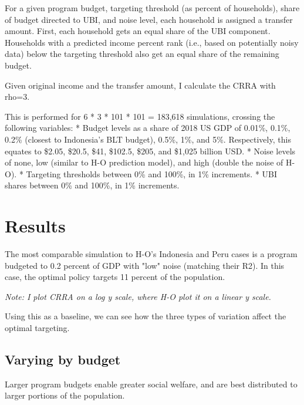 \documentclass[12pt]{article}
\begin{document}
For a given program budget, targeting threshold (as percent of households), 
share of budget directed to UBI, and noise level, each household is assigned a 
transfer amount. First, each household gets an equal share of the UBI 
component. Households with a predicted income percent rank (i.e., based on 
potentially noisy data) below the targeting threshold also get an equal share 
of the remaining budget.

Given original income and the transfer amount, I calculate the CRRA with rho=3.

This is performed for 6 * 3 * 101 * 101 = 183,618 simulations, crossing the 
following variables:
* Budget levels as a share of 2018 US GDP of 0.01\%, 0.1\%, 0.2\% (closest to 
Indonesia's BLT budget), 0.5\%, 1\%, and 5\%. Respectively, this equates to 
\$2.05, \$20.5, \$41, \$102.5, \$205, and \$1,025 billion USD.
* Noise levels of none, low (similar to H-O prediction model), and high (double 
the noise of H-O).
* Targeting thresholds between 0\% and 100\%, in 1\% increments.
* UBI shares between 0\% and 100\%, in 1\% increments.


\section{Results} \label{sec:results}

The most comparable simulation to H-O's Indonesia and Peru cases is a program 
budgeted to 0.2 percent of GDP with "low" noise (matching their R2). In this 
case, the optimal policy targets 11 percent of the population. 

\begin{center}
\label{fig:pov_rate_income}
\end{center}

\it{Note: I plot CRRA on a log y scale, where H-O plot it on a linear y scale.}

Using this as a baseline, we can see how the three types of variation affect 
the optimal targeting.

\subsection{Varying by budget} \label{varying_by_budget}

Larger program budgets enable greater social welfare, and are best distributed 
to larger portions of the population.

\end{document}
